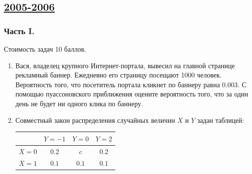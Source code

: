\newpage
\subsection[2005-2006]{\hyperref[sec:sol_kr_01_2005_2006]{2005-2006}}
\label{sec:kr_01_2005_2006}


\subsubsection*{Часть I.}

Стоимость задач 10 баллов.
\begin{enumerate}
\item Вася, владелец крупного Интернет-портала, вывесил на главной странице рекламный
баннер. Ежедневно его страницу посещают 1000 человек. Вероятность того, что посетитель
портала кликнет по баннеру равна 0.003. С помощью пуассоновского приближения оцените
вероятность того, что за один день не будет ни одного клика по баннеру.
\item Совместный закон распределения случайных величин  $X$  и  $Y$  задан таблицей:

\begin{center}
\begin{tabular}{@{}lccc@{}}
\toprule
    & $Y=-1$ & $Y=0$ & $Y=2$ \\ \midrule
$X=0$ & $0.2$  & $c$   & $0.2$ \\
$X=1$ & $0.1$  & $0.1$ & $0.1$ \\ \bottomrule
\end{tabular}
\end{center}


\end{enumerate}
